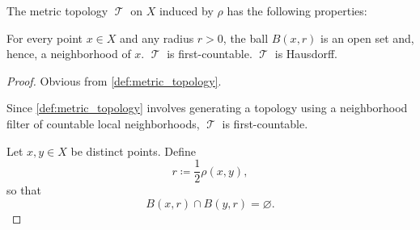 \begin{proposition}\label{thm:def:metric_topology}
  The metric topology \( \mscrT \) on \( X \) induced by \( \rho \) has the following properties:
  \begin{thmenum}
     For every point \( x \in X \) and any radius \( r > 0 \), the ball \( B(x, r) \) is an open set and, hence, a neighborhood of \( x \).
     \( \mscrT \) is first-countable.
     \( \mscrT \) is Hausdorff.
  \end{thmenum}
\end{proposition}
\begin{proof}
   Obvious from \cref{def:metric_topology}.

   Since \cref{def:metric_topology} involves generating a topology using a neighborhood filter of countable local neighborhoods, \( \mscrT \) is first-countable.

   Let \( x, y \in X \) be distinct points. Define
  \begin{equation*}
    r \coloneqq \dfrac 1 2 \rho(x, y),
  \end{equation*}
  so that
  \begin{equation*}
    B(x, r) \cap B(y, r) = \varnothing.
  \end{equation*}
\end{proof}


